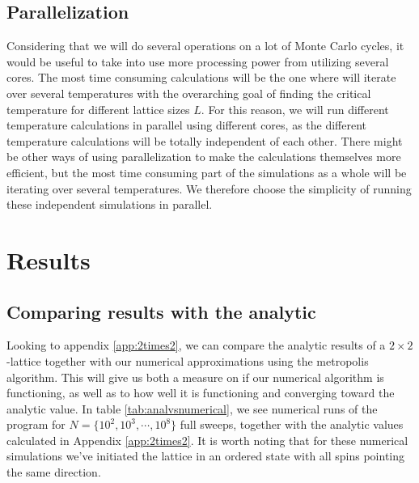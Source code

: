 \documentclass[reprint,english,notitlepage]{revtex4-1}  %
\begin{document}
\subsection{Parallelization}

Considering that we will do several operations on a lot of Monte Carlo cycles, it would be useful to take into use more processing power from utilizing several cores. The most time consuming calculations will be the one where will iterate over several temperatures with the overarching goal of finding the critical temperature for different lattice sizes $L$. For this reason, we will run different temperature calculations in parallel using different cores, as the different temperature calculations will be totally independent of each other. There might be other ways of using parallelization to make the calculations themselves more efficient, but the most time consuming part of the simulations as a whole will be iterating over several temperatures. We therefore choose the simplicity of running these independent simulations in parallel.

\newpage

\section{Results}

\subsection{Comparing results with the analytic}

Looking to appendix \ref{app:2times2}, we can compare the analytic results of a $2\times2$-lattice together with our numerical approximations using the metropolis algorithm. This will give us both a measure on if our numerical algorithm is functioning, as well as to how well it is functioning and converging toward the analytic value. In table \ref{tab:analvsnumerical}, we see numerical runs of the program for $N = \{10^2,10^3,\cdots,10^8\}$ full sweeps, together with the analytic values calculated in Appendix \ref{app:2times2}. It is worth noting that for these numerical simulations we've initiated the lattice in an ordered state with all spins pointing the same direction.
\end{document}

